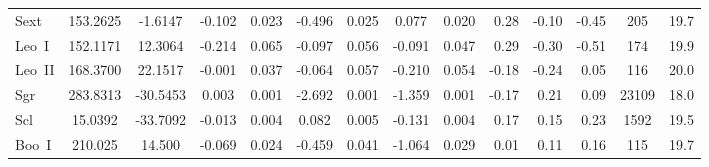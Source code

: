 \documentclass{article}
\begin{document}
\begin{table*}
\begin{tabular}{lccccccccrrrcc}
Sext & 153.2625 & -1.6147  & -0.102 &   0.023         &            -0.496     &                0.025           &     0.077       &      0.020    &        0.28       &         -0.10     &              -0.45     &        205  & 19.7 \\
Leo~I      &  152.1171 & 12.3064 &  -0.214  &  0.065      &              -0.097       &              0.056      &          -0.091      &       0.047       &     0.29       &         -0.30          &         -0.51     &        174  & 19.9 \\
Leo~II     &  168.3700  & 22.1517 &  -0.001  &  0.037     &               -0.064          &           0.057      &          -0.210      &      0.054       &     -0.18      &          -0.24    &                0.05      &       116  & 20.0 \\
Sgr    & 283.8313 & -30.5453  &  0.003  &  0.001                 &    -2.692            &         0.001         &       -1.359   &         0.001     &       -0.17      &          0.21       &             0.09      &    23109  & 18.0 \\
Scl & 15.0392  & -33.7092  & -0.013  &  0.004    &                  0.082         &             0.005       &        -0.131     &       0.004      &       0.17     &            0.15      &            0.23       &    1592  & 19.5 \\
Boo~I  &  210.025  & 14.500  & -0.069  &  0.024    &                 -0.459        &              0.041      &         -1.064    &         0.029    &       0.01     &            0.11      &              0.16      &       115 &  19.7 \\
\hline
\end{tabular}
\end{table*}
\end{document}
